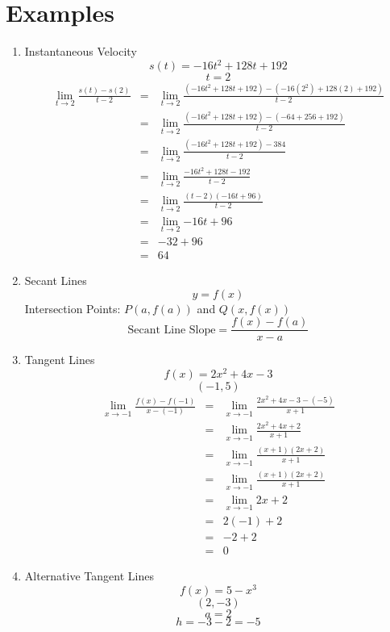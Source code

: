 \documentclass{article}
\begin{document}
\section*{Examples}
\begin{enumerate}
    \item Instantaneous Velocity
    $$s(t) = -16t^2 + 128t + 192$$
    $$t = 2$$
    \begin{eqnarray}
        \lim_{t \to 2}{\frac{s(t) - s(2)}{t - 2}} &=& \lim_{t \to 2}{\frac{(-16t^2 + 128t + 192) - (-16(2^2) + 128(2) + 192)}{t - 2}} \\
        &=& \lim_{t \to 2}{\frac{(-16t^2 + 128t + 192) - (-64 + 256 + 192)}{t - 2}} \\
        &=& \lim_{t \to 2}{\frac{(-16t^2 + 128t + 192) - 384}{t - 2}} \\
        &=& \lim_{t \to 2}{\frac{-16t^2 + 128t - 192}{t - 2}} \\
        &=& \lim_{t \to 2}{\frac{(t - 2)(-16t + 96)}{t - 2}} \\
        &=& \lim_{t \to 2}{-16t + 96} \\
        &=& -32 + 96 \\
        &=& 64
    \end{eqnarray}
    \item Secant Lines
    $$y = f(x)$$
    Intersection Points: $P(a, f(a))$ and $Q(x, f(x))$ \\
    $$\text{Secant Line Slope} = \frac{f(x) - f(a)}{x - a}$$
    \item Tangent Lines
    $$f(x) = 2x^2 + 4x - 3$$
    $$(-1, 5)$$
    \begin{eqnarray}
        \lim_{x \to -1}{\frac{f(x) - f(-1)}{x - (-1)}} &=& \lim_{x \to -1}{\frac{2x^2 + 4x - 3 - (-5)}{x + 1}} \\
        &=& \lim_{x \to -1}{\frac{2x^2 + 4x + 2}{x + 1}} \\
        &=& \lim_{x \to -1}{\frac{(x + 1)(2x + 2)}{x + 1}} \\
        &=& \lim_{x \to -1}{\frac{(x + 1)(2x + 2)}{x + 1}} \\
        &=& \lim_{x \to -1}{2x + 2} \\
        &=& 2(-1) + 2 \\
        &=& -2 + 2 \\
        &=& 0
    \end{eqnarray}
    \item Alternative Tangent Lines
    $$f(x) = 5 - x^3$$
    $$(2, -3)$$
    $$a = 2$$
    $$h = -3 - 2 = -5$$
    \begin{eqnarray}

\end{eqnarray}
\end{enumerate}
\end{document}

